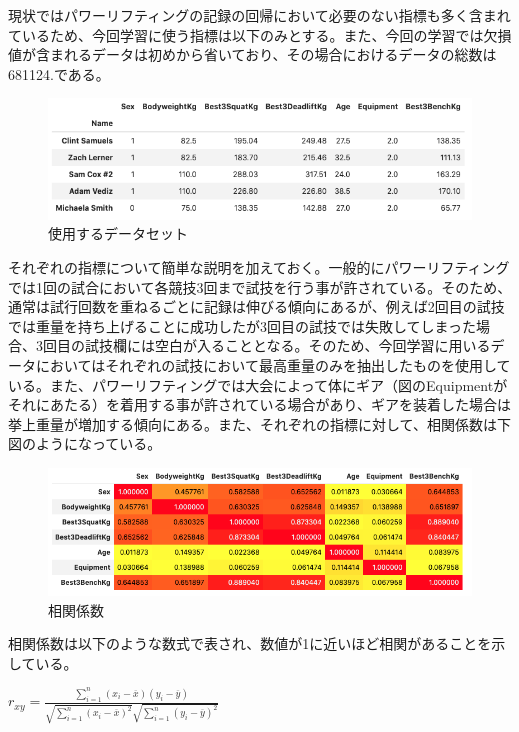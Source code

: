 \documentclass{article}
\begin{document}
現状ではパワーリフティングの記録の回帰において必要のない指標も多く含まれているため、今回学習に使う指標は以下のみとする。また、今回の学習では欠損値が含まれるデータは初めから省いており、その場合におけるデータの総数は681124.である。

\begin{figure}[H]
\begin{center}
\includegraphics[width=\linewidth]{data_trimed.png}
\caption{使用するデータセット}
\end{center}
\end{figure}

それぞれの指標について簡単な説明を加えておく。一般的にパワーリフティングでは1回の試合において各競技3回まで試技を行う事が許されている。そのため、通常は試行回数を重ねるごとに記録は伸びる傾向にあるが、例えば2回目の試技では重量を持ち上げることに成功したが3回目の試技では失敗してしまった場合、3回目の試技欄には空白が入ることとなる。そのため、今回学習に用いるデータにおいてはそれぞれの試技において最高重量のみを抽出したものを使用している。また、パワーリフティングでは大会によって体にギア（図のEquipmentがそれにあたる）を着用する事が許されている場合があり、ギアを装着した場合は挙上重量が増加する傾向にある。また、それぞれの指標に対して、相関係数は下図のようになっている。

\begin{figure}[H]
\begin{center}
\includegraphics[width=\linewidth]{corr.png}
\caption{相関係数}
\end{center}
\end{figure}

相関係数は以下のような数式で表され、数値が1に近いほど相関があることを示している。

\begin{center}
\begin{math}
r_{xy} = \frac{\displaystyle \sum_{i = 1}^n (x_i - \overline{x})
(y_i - \overline{y})}{\sqrt{\displaystyle \sum_{i = 1}^n 
(x_i - \overline{x})^2}\sqrt{\displaystyle \sum_{i = 1}^n 
(y_i - \overline{y})^2}}
\end{math}
\end{center}
\end{document}
